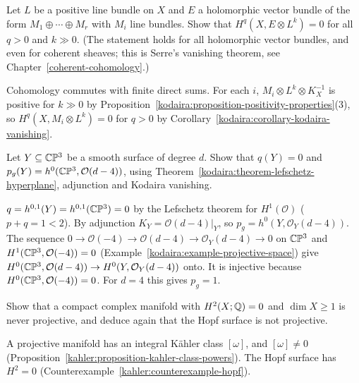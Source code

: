 \begin{exercise}\label{kodaira:exercise-serre-vanishing}
Let $L$ be a positive line bundle on $X$ and $E$ a holomorphic vector bundle of the form $M_1 \oplus \cdots \oplus M_r$ with $M_i$ line bundles. Show
that $H^q(X, E \otimes L^k) = 0$ for all $q > 0$ and $k \gg 0$. (The statement holds for all holomorphic vector bundles, and even for coherent
sheaves; this is Serre's vanishing theorem, see Chapter~\ref{coherent-cohomology}.)
\end{exercise}

\begin{solution}
Cohomology commutes with finite direct sums. For each $i$, $M_i \otimes L^k \otimes K_X^{-1}$ is positive for $k \gg 0$ by
Proposition~\ref{kodaira:proposition-positivity-properties}(3), so $H^q(X, M_i \otimes L^k) = 0$ for $q > 0$ by
Corollary~\ref{kodaira:corollary-kodaira-vanishing}.
\end{solution}

\begin{exercise}\label{kodaira:exercise-hypersurface-hodge}
Let $Y \subseteq \mathbb{C}\mathbb{P}^3$ be a smooth surface of degree $d$. Show that $q(Y) = 0$ and $p_g(Y) = h^0(\mathbb{C}\mathbb{P}^3, \mathcal{O}(d - 4))$, using
Theorem~\ref{kodaira:theorem-lefschetz-hyperplane}, adjunction and Kodaira vanishing.
\end{exercise}

\begin{solution}
$q = h^{0,1}(Y) = h^{0,1}(\mathbb{C}\mathbb{P}^3) = 0$ by the Lefschetz theorem for $H^1(\mathcal{O})$ ($p + q = 1 < 2$). By adjunction
$K_Y = \mathcal{O}(d - 4)|_Y$, so $p_g = h^0(Y, \mathcal{O}_Y(d - 4))$. The sequence $0 \to \mathcal{O}(-4) \to \mathcal{O}(d - 4) \to \mathcal{O}_Y(d - 4) \to 0$ on
$\mathbb{C}\mathbb{P}^3$ and $H^1(\mathbb{C}\mathbb{P}^3, \mathcal{O}(-4)) = 0$ (Example~\ref{kodaira:example-projective-space}) give $H^0(\mathbb{C}\mathbb{P}^3, \mathcal{O}(d-4)) \to H^0(Y, \mathcal{O}_Y(d-4))$
onto. It is injective because $H^0(\mathbb{C}\mathbb{P}^3, \mathcal{O}(-4)) = 0$. For $d = 4$ this gives $p_g = 1$.
\end{solution}

\begin{exercise}\label{kodaira:exercise-not-hodge}
Show that a compact complex manifold with $H^2(X; \mathbb{Q}) = 0$ and $\dim X \geq 1$ is never projective, and deduce again that the Hopf surface is not
projective.
\end{exercise}

\begin{solution}
A projective manifold has an integral K\"ahler class $[\omega]$, and $[\omega] \neq 0$ (Proposition~\ref{kahler:proposition-kahler-class-powers}). The Hopf
surface has $H^2 = 0$ (Counterexample~\ref{kahler:counterexample-hopf}).
\end{solution}

